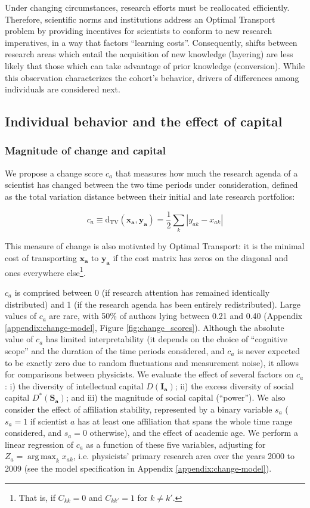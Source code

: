 \documentclass{article}
\DeclareMathOperator*{\argmax}{arg\,max}
\begin{document}
Under changing circumstances, research efforts must be reallocated efficiently. Therefore, scientific norms and institutions address an Optimal Transport problem by providing incentives for scientists to conform to new research imperatives, in a way that factors ``learning costs''. Consequently, shifts between research areas which entail the acquisition of new knowledge (layering) are less likely that those which can take advantage of prior knowledge (conversion). While this observation characterizes the cohort's behavior, drivers of differences among individuals are considered next.

\subsection{\label{sec:comparative}Individual behavior and the effect of capital}

\subsubsection{Magnitude of change and capital}

We propose a change score $c_a$ that measures how much the research agenda of a scientist has changed between the two time periods under consideration, defined as the total variation distance between their initial and late research portfolios:

\begin{equation}
    c_a \equiv \mathrm{d}_{\text{TV}}(\bm{x_a},\bm{y_a}) = \frac{1}{2} \sum_k |y_{ak}-x_{ak}|
\end{equation}

This measure of change is also motivated by Optimal Transport: it is the minimal cost of transporting $\bm{x_a}$ to $\bm{y_a}$ if the cost matrix has zeros on the diagonal and ones everywhere else\footnote{That is, if $C_{kk}=0$ and $C_{kk'}=1$ for $k\neq k'$.}.

$c_a$ is comprised between 0 (if research attention has remained identically distributed) and 1 (if the research agenda has been entirely redistributed).
Large values of $c_a$ are rare, with 50\% of authors lying between 0.21 and 0.40  (Appendix \ref{appendix:change-model}, Figure \ref{fig:change_scores}). Although the absolute value of $c_a$ has limited interpretability (it depends on the choice of ``cognitive scope''   and the duration of the time periods considered, and $c_a$ is never expected to be exactly zero due to random fluctuations and measurement noise), it allows for comparisons between physicists. We evaluate the effect of several factors on $c_a$: i) the diversity of intellectual capital $D(\bm{I_a})$; ii) the excess diversity of social capital $D^{\ast}(\bm{S_a})$; and iii) the magnitude of social capital (``power''). We also consider the effect of affiliation stability, represented by a binary variable $s_a$ ($s_a=1$ if scientist $a$ has at least one affiliation that spans the whole time range considered, and $s_a=0$ otherwise), and the effect of academic age. We perform a linear regression of $c_a$ as a function of these five variables, adjusting for $Z_a=\argmax_{k} x_{ak}$, i.e. physicists' primary research area over the years 2000 to 2009 (see the model specification in Appendix \ref{appendix:change-model}).
\end{document}
